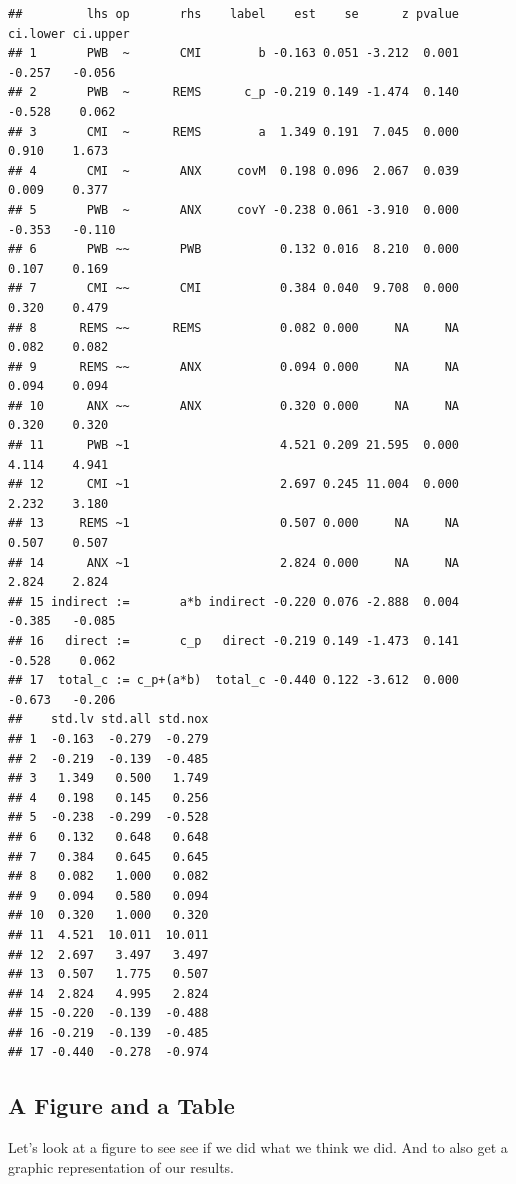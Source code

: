 \documentclass[
  11pt,
]{book}
\begin{document}
\begin{verbatim}
##         lhs op       rhs    label    est    se      z pvalue ci.lower ci.upper
## 1       PWB  ~       CMI        b -0.163 0.051 -3.212  0.001   -0.257   -0.056
## 2       PWB  ~      REMS      c_p -0.219 0.149 -1.474  0.140   -0.528    0.062
## 3       CMI  ~      REMS        a  1.349 0.191  7.045  0.000    0.910    1.673
## 4       CMI  ~       ANX     covM  0.198 0.096  2.067  0.039    0.009    0.377
## 5       PWB  ~       ANX     covY -0.238 0.061 -3.910  0.000   -0.353   -0.110
## 6       PWB ~~       PWB           0.132 0.016  8.210  0.000    0.107    0.169
## 7       CMI ~~       CMI           0.384 0.040  9.708  0.000    0.320    0.479
## 8      REMS ~~      REMS           0.082 0.000     NA     NA    0.082    0.082
## 9      REMS ~~       ANX           0.094 0.000     NA     NA    0.094    0.094
## 10      ANX ~~       ANX           0.320 0.000     NA     NA    0.320    0.320
## 11      PWB ~1                     4.521 0.209 21.595  0.000    4.114    4.941
## 12      CMI ~1                     2.697 0.245 11.004  0.000    2.232    3.180
## 13     REMS ~1                     0.507 0.000     NA     NA    0.507    0.507
## 14      ANX ~1                     2.824 0.000     NA     NA    2.824    2.824
## 15 indirect :=       a*b indirect -0.220 0.076 -2.888  0.004   -0.385   -0.085
## 16   direct :=       c_p   direct -0.219 0.149 -1.473  0.141   -0.528    0.062
## 17  total_c := c_p+(a*b)  total_c -0.440 0.122 -3.612  0.000   -0.673   -0.206
##    std.lv std.all std.nox
## 1  -0.163  -0.279  -0.279
## 2  -0.219  -0.139  -0.485
## 3   1.349   0.500   1.749
## 4   0.198   0.145   0.256
## 5  -0.238  -0.299  -0.528
## 6   0.132   0.648   0.648
## 7   0.384   0.645   0.645
## 8   0.082   1.000   0.082
## 9   0.094   0.580   0.094
## 10  0.320   1.000   0.320
## 11  4.521  10.011  10.011
## 12  2.697   3.497   3.497
## 13  0.507   1.775   0.507
## 14  2.824   4.995   2.824
## 15 -0.220  -0.139  -0.488
## 16 -0.219  -0.139  -0.485
## 17 -0.440  -0.278  -0.974
\end{verbatim}

\hypertarget{a-figure-and-a-table-1}{%
\subsection{A Figure and a Table}\label{a-figure-and-a-table-1}}

Let's look at a figure to see see if we did what we think we did. And to also get a graphic representation of our results.
\end{document}
